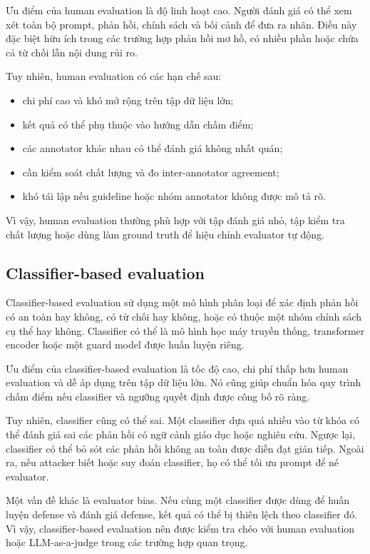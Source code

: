 Ưu điểm của human evaluation là độ linh hoạt cao. Người đánh giá có thể
xem xét toàn bộ prompt, phản hồi, chính sách và bối cảnh để đưa ra nhãn.
Điều này đặc biệt hữu ích trong các trường hợp phản hồi mơ hồ, có nhiều
phần hoặc chứa cả từ chối lẫn nội dung rủi ro.

Tuy nhiên, human evaluation có các hạn chế sau:

\begin{itemize}[leftmargin=1.2cm]
    \item chi phí cao và khó mở rộng trên tập dữ liệu lớn;
    \item kết quả có thể phụ thuộc vào hướng dẫn chấm điểm;
    \item các annotator khác nhau có thể đánh giá không nhất quán;
    \item cần kiểm soát chất lượng và đo inter-annotator agreement;
    \item khó tái lập nếu guideline hoặc nhóm annotator không được mô tả rõ.
\end{itemize}

Vì vậy, human evaluation thường phù hợp với tập đánh giá nhỏ, tập kiểm tra
chất lượng hoặc dùng làm ground truth để hiệu chỉnh evaluator tự động.

\subsection{Classifier-based evaluation}
\label{subsec:classifier-based-evaluation}

Classifier-based evaluation sử dụng một mô hình phân loại để xác định phản
hồi có an toàn hay không, có từ chối hay không, hoặc có thuộc một nhóm
chính sách cụ thể hay không. Classifier có thể là mô hình học máy truyền
thống, transformer encoder hoặc một guard model được huấn luyện riêng.

Ưu điểm của classifier-based evaluation là tốc độ cao, chi phí thấp hơn
human evaluation và dễ áp dụng trên tập dữ liệu lớn. Nó cũng giúp chuẩn
hóa quy trình chấm điểm nếu classifier và ngưỡng quyết định được công bố
rõ ràng.

Tuy nhiên, classifier cũng có thể sai. Một classifier dựa quá nhiều vào
từ khóa có thể đánh giá sai các phản hồi có ngữ cảnh giáo dục hoặc nghiên
cứu. Ngược lại, classifier có thể bỏ sót các phản hồi không an toàn được
diễn đạt gián tiếp. Ngoài ra, nếu attacker biết hoặc suy đoán classifier,
họ có thể tối ưu prompt để né evaluator.

Một vấn đề khác là evaluator bias. Nếu cùng một classifier được dùng để
huấn luyện defense và đánh giá defense, kết quả có thể bị thiên lệch theo
classifier đó. Vì vậy, classifier-based evaluation nên được kiểm tra chéo
với human evaluation hoặc LLM-as-a-judge trong các trường hợp quan trọng.

